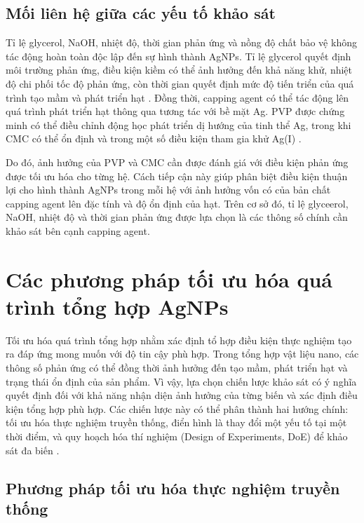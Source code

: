 \subsection{Mối liên hệ giữa các yếu tố khảo sát}
Tỉ lệ glycerol, NaOH, nhiệt độ, thời gian phản ứng và nồng độ chất bảo vệ không tác động hoàn toàn độc lập đến sự hình thành AgNPs.
Tỉ lệ glycerol quyết định môi trường phản ứng, điều kiện kiềm có thể ảnh hưởng đến khả năng khử, nhiệt độ chi phối tốc độ phản ứng, còn thời gian quyết định mức độ tiến triển của quá trình tạo mầm và phát triển hạt \parencite{jun2022,liu2020glycerol,hemmati2020,kim2006}.
Đồng thời, capping agent có thể tác động lên quá trình phát triển hạt thông qua tương tác với bề mặt Ag.
PVP được chứng minh có thể điều chỉnh động học phát triển dị hướng của tinh thể Ag, trong khi CMC có thể ổn định và trong một số điều kiện tham gia khử Ag(I) \parencite{chen2019,ly2024}.
\par
Do đó, ảnh hưởng của PVP và CMC cần được đánh giá với điều kiện phản ứng được tối ưu hóa cho từng hệ.
Cách tiếp cận này giúp phân biệt điều kiện thuận lợi cho hình thành AgNPs trong mỗi hệ với ảnh hưởng vốn có của bản chất capping agent lên đặc tính và độ ổn định của hạt.
Trên cơ sở đó, tỉ lệ glyceerol, NaOH, nhiệt độ và thời gian phản ứng được lựa chọn là các thông số chính cần khảo sát bên cạnh capping agent.

\section{Các phương pháp tối ưu hóa quá trình tổng hợp AgNPs}
Tối ưu hóa quá trình tổng hợp nhằm xác định tổ hợp điều kiện thực nghiệm tạo ra đáp ứng mong muốn với độ tin cậy phù hợp.
Trong tổng hợp vật liệu nano, các thông số phản ứng có thể đồng thời ảnh hưởng đến tạo mầm, phát triển hạt và trạng thái ổn định của sản phẩm.
Vì vậy, lựa chọn chiến lược khảo sát có ý nghĩa quyết định đối với khả năng nhận diện ảnh hưởng của từng biến và xác định điều kiện tổng hợp phù hợp.
Các chiến lược này có thể phân thành hai hướng chính: tối ưu hóa thực nghiệm truyền thống, điển hình là thay đổi một yếu tố tại một thời điểm, và quy hoạch hóa thí nghiệm (Design of Experiments, DoE) để khảo sát đa biến \parencite{bezerra2008,montgomery2017}.

\subsection{Phương pháp tối ưu hóa thực nghiệm truyền thống}
